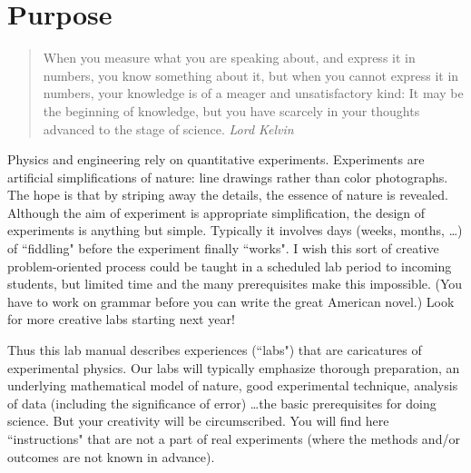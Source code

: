 \newapp
\section*{Purpose}

\begin{quote}
When you measure what you are speaking about, and express it in numbers,
you know something about it, but when you cannot express it in numbers,
your knowledge is of a meager and unsatisfactory kind: It may be the beginning 
of knowledge, but you have scarcely in your thoughts advanced to
the stage of science.  {\em Lord Kelvin}
\end{quote}


Physics and engineering rely on quantitative experiments.
Experiments are artificial simplifications of nature:
line drawings rather than color photographs.  The hope is that by striping away
the details, the essence of nature is revealed.  
Although the aim of experiment is appropriate 
simplification, the design of experiments is anything but simple.
Typically it involves days (weeks, months, \ldots) of ``fiddling"
before the experiment finally ``works".  I wish this sort of creative
problem-oriented process
could be taught in a scheduled lab period to incoming students,
but limited time and the many prerequisites make this impossible.
(You have to work on grammar before you can write the great American
novel.)  Look for more creative labs starting next year!


Thus this lab manual describes experiences (``labs")
that are caricatures of experimental physics.
Our labs will typically 
emphasize thorough preparation, an underlying mathematical
model of nature, good experimental technique, analysis
of data (including the significance of error)
\ldots the basic prerequisites for doing science.
But your creativity will be circumscribed.  You will find here ``instructions"
that are not a part of real experiments (where the methods and/or  outcomes
are not known in advance).  

